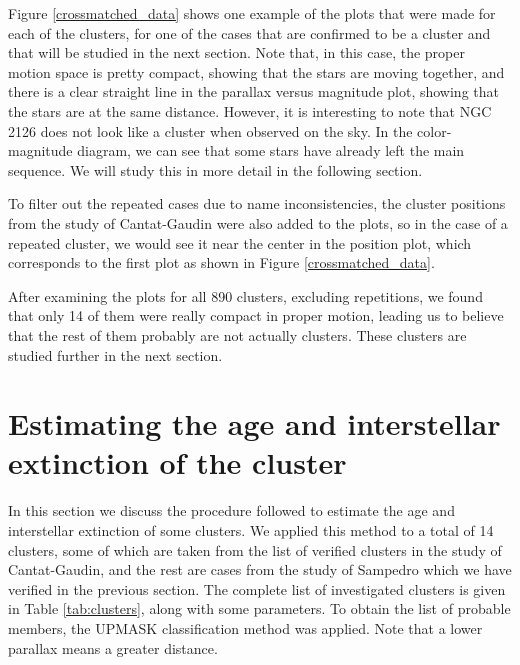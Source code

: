 \documentclass[twocolumn]{revtex4}
\begin{document}
Figure \ref{crossmatched_data} shows one example of the plots that were made for each of the clusters, for one of the cases that are confirmed to be a cluster and that will be studied in the next section. Note that, in this case, the proper motion space is pretty compact, showing that the stars are moving together, and there is a clear straight line in the parallax versus magnitude plot, showing that the stars are at the same distance. However, it is interesting to note that NGC 2126 does not look like a cluster when observed on the sky. In the color-magnitude diagram, we can see that some stars have already left the main sequence. We will study this in more detail in the following section.


To filter out the repeated cases due to name inconsistencies, the cluster positions from the study of Cantat-Gaudin were also added to the plots, so in the case of a repeated cluster, we would see it near the center in the position plot, which corresponds to the first plot as shown in Figure \ref{crossmatched_data}.

After examining the plots for all 890 clusters, excluding repetitions, we found that only 14 of them were really compact in proper motion, leading us to believe that the rest of them probably are not actually clusters. These clusters are studied further in the next section.

\section{Estimating the age and interstellar extinction of the cluster}
In this section we discuss the procedure followed to estimate the age and interstellar extinction of some clusters. We applied this method to a total of 14 clusters, some of which are taken from the list of verified clusters in the study of Cantat-Gaudin, and the rest are cases from the study of Sampedro which we have verified in the previous section. The complete list of investigated clusters is given in Table \ref{tab:clusters}, along with some parameters. To obtain the list of probable members, the UPMASK classification method \cite{cantat-gaudin} was applied.
Note that a lower parallax means a greater distance.
\end{document}
